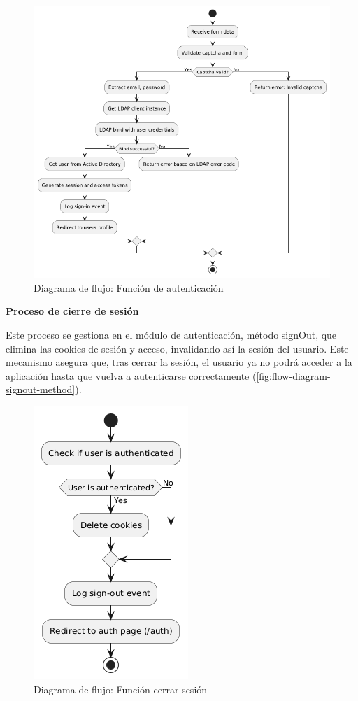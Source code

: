 \begin{figure}[H]
    \centering
    \includegraphics[scale=0.5]{images/puml/flow-diagram-signin/flow-diagram signin.png}
    \caption{Diagrama de flujo: Función de autenticación}
    \label{fig:flow-diagram-auth-method}
\end{figure}

\textbf{Proceso de cierre de sesión}

Este proceso se gestiona en el módulo de autenticación, método signOut, que elimina las cookies de sesión y acceso, invalidando así la sesión del usuario. Este mecanismo asegura que, tras cerrar la sesión, el usuario ya no podrá acceder a la aplicación hasta que vuelva a autenticarse correctamente (\autoref{fig:flow-diagram-signout-method}).

\begin{figure}[H]
    \centering
    \includegraphics[scale=0.6]{images/puml/flow-diagram-signout/flow-diagram signout.png}
    \caption{Diagrama de flujo: Función cerrar sesión}
    \label{fig:flow-diagram-signout-method}
\end{figure}
